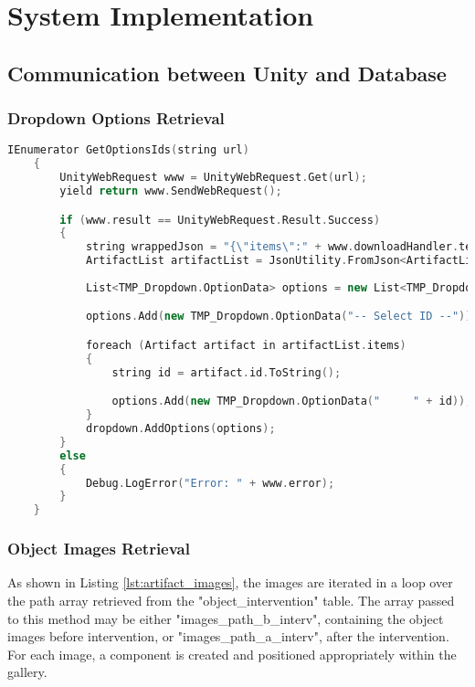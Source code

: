 \section{System Implementation}

\subsection{Communication between Unity and Database}

\subsubsection{Dropdown Options Retrieval}

\begin{lstlisting}[language=C++, caption={Method used to load artifact IDs and define as options in the Dropdown.}, label={lst:artifact_ids}]
      IEnumerator GetOptionsIds(string url)
    {
        UnityWebRequest www = UnityWebRequest.Get(url);
        yield return www.SendWebRequest();

        if (www.result == UnityWebRequest.Result.Success)
        {
            string wrappedJson = "{\"items\":" + www.downloadHandler.text + "}";
            ArtifactList artifactList = JsonUtility.FromJson<ArtifactList>(wrappedJson);
            
            List<TMP_Dropdown.OptionData> options = new List<TMP_Dropdown.OptionData>();

            options.Add(new TMP_Dropdown.OptionData("-- Select ID --"));

            foreach (Artifact artifact in artifactList.items)
            {
                string id = artifact.id.ToString();

                options.Add(new TMP_Dropdown.OptionData("     " + id));
            }
            dropdown.AddOptions(options);
        }
        else
        {
            Debug.LogError("Error: " + www.error);
        }
    }
\end{lstlisting}
\subsubsection{Object Images Retrieval}

As shown in Listing \ref{lst:artifact_images}, the images are iterated in a loop over the path array retrieved from the "object\_intervention" table. The array passed to this method may be either "images\_path\_b\_interv", containing the object images before intervention, or "images\_path\_a\_interv", after the intervention.
For each image, a component is created and positioned appropriately within the gallery.


